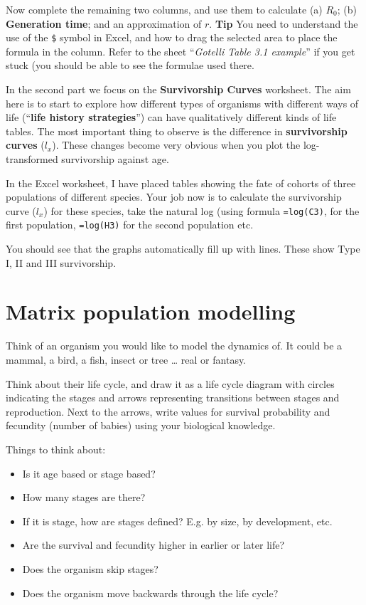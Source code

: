 \documentclass[
  a4paper]{book}
\providecommand{\tightlist}{%
  \setlength{\itemsep}{0pt}\setlength{\parskip}{0pt}}
\begin{document}
Now complete the remaining two columns, and use them to calculate (a)
\(R_0\); (b) \textbf{Generation time}; and an approximation of \(r\).
\textbf{Tip} You need to understand the use of the \texttt{\$} symbol in
Excel, and how to drag the selected area to place the formula in the
column. Refer to the sheet ``\emph{Gotelli Table 3.1 example}'' if you
get stuck (you should be able to see the formulae used there.

In the second part we focus on the \textbf{Survivorship Curves}
worksheet. The aim here is to start to explore how different types of
organisms with different ways of life (``\textbf{life history
strategies}'') can have qualitatively different kinds of life tables.
The most important thing to observe is the difference in
\textbf{survivorship curves} (\(l_x\)). These changes become very
obvious when you plot the log-transformed survivorship against age.

In the Excel worksheet, I have placed tables showing the fate of cohorts
of three populations of different species. Your job now is to calculate
the survivorship curve (\(l_x\)) for these species, take the natural log
(using formula \texttt{=log(C3)}, for the first population,
\texttt{=log(H3)} for the second population etc.

You should see that the graphs automatically fill up with lines. These
show Type I, II and III survivorship.

\hypertarget{matrix-population-modelling}{%
\chapter{Matrix population
modelling}\label{matrix-population-modelling}}

Think of an organism you would like to model the dynamics of. It could
be a mammal, a bird, a fish, insect or tree \ldots{} real or fantasy.

Think about their life cycle, and draw it as a life cycle diagram with
circles indicating the stages and arrows representing transitions
between stages and reproduction. Next to the arrows, write values for
survival probability and fecundity (number of babies) using your
biological knowledge.

Things to think about:

\begin{itemize}
\tightlist
\item
  Is it age based or stage based?
\item
  How many stages are there?
\item
  If it is stage, how are stages defined? E.g. by size, by development,
  etc.
\item
  Are the survival and fecundity higher in earlier or later life?
\item
  Does the organism skip stages?
\item
  Does the organism move backwards through the life cycle?
\end{itemize}
\end{document}
